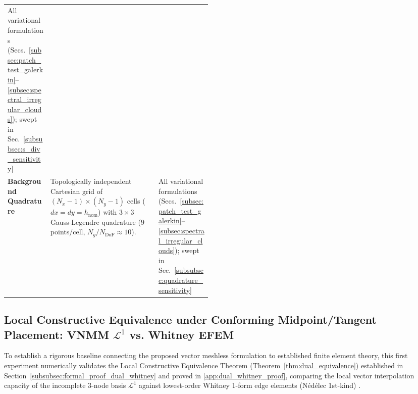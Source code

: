 \documentclass[preprint,12pt]{elsarticle}
\begin{document}
\begin{table}[!htbp]
\begin{tabularx}{\linewidth}{@{}
        >{\raggedright\arraybackslash}p{0.21\linewidth}
        >{\raggedright\arraybackslash}X
        >{\raggedright\arraybackslash}p{0.26\linewidth}
        @{}}
        All variational formulations (Secs.~\ref{subsec:patch_test_galerkin}--\ref{subsec:spectral_irregular_clouds}); swept in Sec.~\ref{subsubsec:s_div_sensitivity}                                                                                                                                        \\
        \textbf{Background Quadrature}                                                                                                                                                                                                                                                                      &
        Topologically independent Cartesian grid of $(N_x - 1) \times (N_y - 1)$ cells ($dx = dy = h_{\mathrm{nom}}$) with $3 \times 3$ Gauss-Legendre quadrature ($9$ points/cell, $N_g / N_{\mathrm{DoF}} \approx 10$).                                                                                   &
        All variational formulations (Secs.~\ref{subsec:patch_test_galerkin}--\ref{subsec:spectral_irregular_clouds}); swept in Sec.~\ref{subsubsec:quadrature_sensitivity}                                                                                                                                   \\
        \bottomrule
    \end{tabularx}
\end{table}


\subsection{Local Constructive Equivalence under Conforming Midpoint/Tangent Placement: VNMM \texorpdfstring{$\mathcal{L}^1$}{L1} vs. Whitney EFEM}
\label{subsec:conforming_dual_equivalence}

To establish a rigorous baseline connecting the proposed vector meshless formulation to established finite element theory, this first experiment numerically validates the Local Constructive Equivalence Theorem (Theorem~\ref{thm:dual_equivalence}) established in Section~\ref{subsubsec:formal_proof_dual_whitney} and proved in \ref{app:dual_whitney_proof}, comparing the local vector interpolation capacity of the incomplete 3-node basis $\mathcal{L}^1$ against lowest-order Whitney 1-form edge elements (N\'ed\'elec 1st-kind) \cite{nedelec1980mixed, monk2003finite, boffi2013mixed}.
\end{document}
